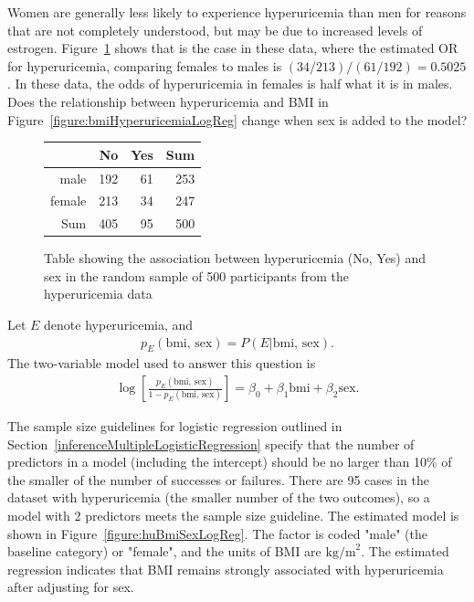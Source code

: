 Women are generally less likely to experience hyperuricemia than men for reasons that are not completely understood, but may be due to increased levels of estrogen.  Figure~\ref{figure:huSexTable} shows that is the case in these data, where the estimated OR for hyperuricemia, comparing females to males is $(34/213)/(61/192) = 0.5025$. In these data, the odds of hyperuricemia in females is half what it is in males.  Does the relationship between hyperuricemia and BMI in Figure~\ref{figure:bmiHyperuricemiaLogReg} change when sex is added to the model?

\begin{figure}[ht]
\centering
\begin{tabular}{rrrr}
  \hline
 & No & Yes & Sum \\ 
  \hline
male & 192 & 61 & 253 \\ 
  female & 213 & 34 & 247 \\ 
  Sum & 405 & 95 & 500 \\ 
   \hline
\end{tabular}
\caption{Table showing the association between hyperuricemia (No, Yes)
       and sex in the random sample of 500 participants from the hyperuricemia
       data} 
\label{figure:huSexTable}
\end{figure}

Let $E$ denote hyperuricemia, and
\begin{align*}
p_E(\text{bmi, sex}) = P(E | \text{bmi, sex}).
\end{align*}
The two-variable model used to answer this question is 
\begin{align}
\log\left[\frac{p_E(\text{bmi, sex})}{1 - p_E(\text{bmi, sex})}\right] = \beta_0 +
\beta_1 \text{bmi}  + \beta_2 \text{sex}.
\label{eqn:hyperuricemiaBMISex}
\end{align}

The sample size guidelines for logistic regression outlined in Section~\ref{inferenceMultipleLogisticRegression} specify that the number of predictors in a model (including the intercept) should be no larger than 10\% of the smaller of the number of successes or failures.  There are 95 cases in the dataset with hyperuricemia (the smaller number of the two outcomes), so a model with 2 predictors meets the sample size guideline. The estimated model is shown in Figure~\ref{figure:huBmiSexLogReg}.  The factor  is coded "male" (the baseline category) or "female", and the units of BMI are $\text{kg/m}^2$. The estimated regression indicates that BMI remains strongly associated with hyperuricemia after adjusting for  sex.

